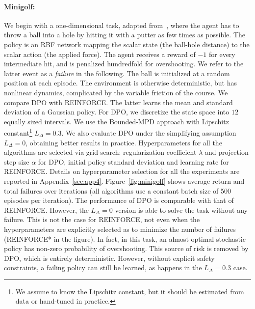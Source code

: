 \paragraph{Minigolf:}
We begin with a one-dimensional task, adapted from~\citet{doro2019gradient}, where the agent has to throw a ball into a hole by hitting it with a putter as few times as possible. The policy is an RBF network mapping the scalar state (the ball-hole distance) to the scalar action (the applied force). 
The agent receives a reward of $-1$ for every intermediate hit, and is penalized hundredfold for overshooting. We refer to the latter event as a \textit{failure} in the following.
The ball is initialized at a random position at each episode. The environment is otherwise deterministic, but has nonlinear dynamics, complicated by the variable friction of the course.
We compare DPO with REINFORCE. The latter learns the mean and standard deviation of a Gaussian policy.
For DPO, we discretize the state space into $12$ equally sized intervals. We use the Bounded-MPD approach with Lipschitz constant\footnote{We assume to know the Lipschitz constant, but it should be estimated from data or hand-tuned in practice.} $L_{\Delta}=0.3$. We also evaluate DPO under the simplifying assumption $L_{\Delta}=0$, obtaining better results in practice.
Hyperparameters for all the algorithms are selected via grid search: regularization coefficient $\lambda$ and projection step size $\alpha$ for DPO, initial policy standard deviation and learning rate for REINFORCE.
Details on hyperparameter selection for all the experiments are reported in Appendix~\ref{sec:app4}.
Figure~\ref{fig:minigolf} shows average return and total failures over iterations (all algorithms use a constant batch size of 500 episodes per iteration). The performance of DPO is comparable with that of REINFORCE. However, the $L_{\Delta}=0$ version is able to solve the task without any failure. This is not the case for REINFORCE, not even when the hyperparameters are explicitly selected as to minimize the number of failures (REINFORCE* in the figure). In fact, in this task, an almost-optimal stochastic policy has non-zero probability of overshooting. This source of risk is removed by DPO, which is entirely deterministic. However, without explicit safety constraints, a failing policy can still be learned, as happens in the $L_{\Delta}=0.3$ case.

